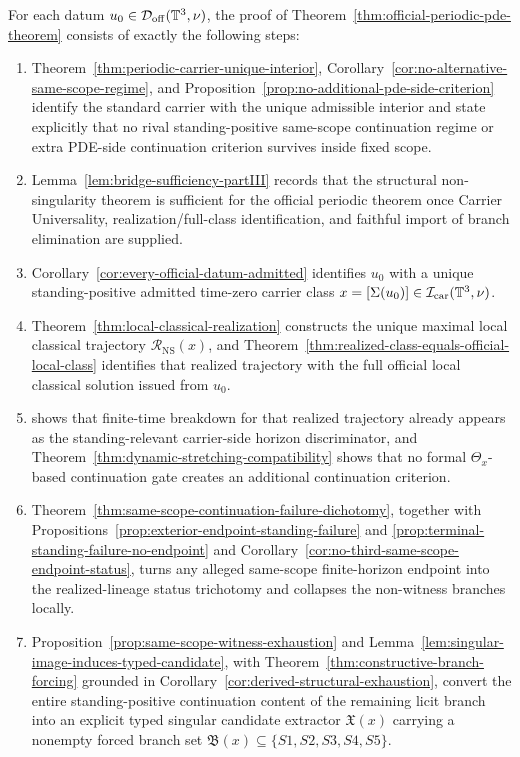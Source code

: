 \begin{proposition}\label{prop:compressed-dependency-chain-official}
For each datum $u_0\in\mathcal D_{\mathrm{off}}(\mathbb{T}^3,\nu)$, the proof of
Theorem~\ref{thm:official-periodic-pde-theorem} consists of exactly the following steps:
\begin{enumerate}[label=(\roman*), leftmargin=2.2em]
\item Theorem~\ref{thm:periodic-carrier-unique-interior}, Corollary~\ref{cor:no-alternative-same-scope-regime}, and Proposition~\ref{prop:no-additional-pde-side-criterion} identify the standard carrier with the unique admissible interior and state explicitly that no rival standing-positive same-scope continuation regime or extra PDE-side continuation criterion survives inside fixed scope.
\item Lemma~\ref{lem:bridge-sufficiency-partIII} records that the structural non-singularity theorem is sufficient for the official periodic theorem once Carrier Universality, realization/full-class identification, and faithful import of branch elimination are supplied.
\item Corollary~\ref{cor:every-official-datum-admitted} identifies $u_0$ with a unique standing-positive admitted time-zero carrier class $x=[\Sigma(u_0)]\in\mathcal I_{\mathrm{car}}(\mathbb{T}^3,\nu)$.
\item Theorem~\ref{thm:local-classical-realization} constructs the unique maximal local classical trajectory $\mathcal R_{\mathrm{NS}}(x)$, and Theorem~\ref{thm:realized-class-equals-official-local-class} identifies that realized trajectory with the full official local classical solution issued from $u_0$.
\item \HorizonDetectabilityRef{} shows that finite-time breakdown for that realized trajectory already appears as the standing-relevant carrier-side horizon discriminator, and Theorem~\ref{thm:dynamic-stretching-compatibility} shows that no formal $\Theta_x$-based continuation gate creates an additional continuation criterion.
\item Theorem~\ref{thm:same-scope-continuation-failure-dichotomy}, together with Propositions~\ref{prop:exterior-endpoint-standing-failure} and \ref{prop:terminal-standing-failure-no-endpoint} and Corollary~\ref{cor:no-third-same-scope-endpoint-status}, turns any alleged same-scope finite-horizon endpoint into the realized-lineage status trichotomy and collapses the non-witness branches locally.
\item Proposition~\ref{prop:same-scope-witness-exhaustion} and Lemma~\ref{lem:singular-image-induces-typed-candidate}, with Theorem~\ref{thm:constructive-branch-forcing} grounded in Corollary~\ref{cor:derived-structural-exhaustion}, convert the entire standing-positive continuation content of the remaining licit branch into an explicit typed singular candidate extractor $\mathfrak X(x)$ carrying a nonempty forced branch set $\mathfrak B(x)\subseteq\{S1,S2,S3,S4,S5\}$.

\end{enumerate}
\end{proposition}
